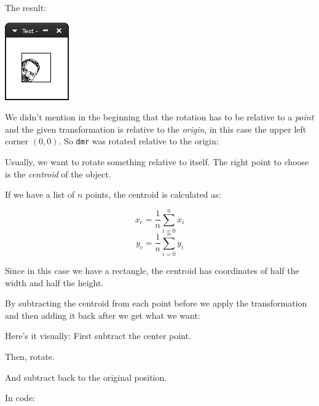 \documentclass[12pt,a4,oneside,usenames,dvipsnames]{book}
\begin{document}
The result:

\includegraphics{figures/ch11-2.png}

We didn't mention in the beginning that the rotation has to be relative to a \emph{point} and the given transformation is relative to the \emph{origin}, in this case the upper left corner $(0,0)$. So \texttt{dmr} was rotated relative to the origin:
\begin{center}
  \def\svgscale{0.6}

  \def\svgscale{0.6}

\end{center}

Usually, we want to rotate something relative to itself. The right point to choose is the \emph{centroid} of the object.

If we have a list of $n$ points, the centroid is calculated as:

$$ x_c = \frac{1}{n}\sum_{i=0}^{n} x_i $$
$$ y_c = \frac{1}{n}\sum_{i=0}^{n} y_i $$

Since in this case we have a rectangle, the centroid has coordinates of half the width and half the height.

By subtracting the centroid from each point before we apply the transformation and then adding it back after we get what we want:

Here's it visually: First subtract the center point.

\begin{center}
  \def\svgscale{0.6}

\end{center}

Then, rotate.

\begin{center}
  \def\svgscale{0.6}

\end{center}

And subtract back to the original position.

\begin{center}
  \def\svgscale{0.6}

\end{center}

In code:
\end{document}
